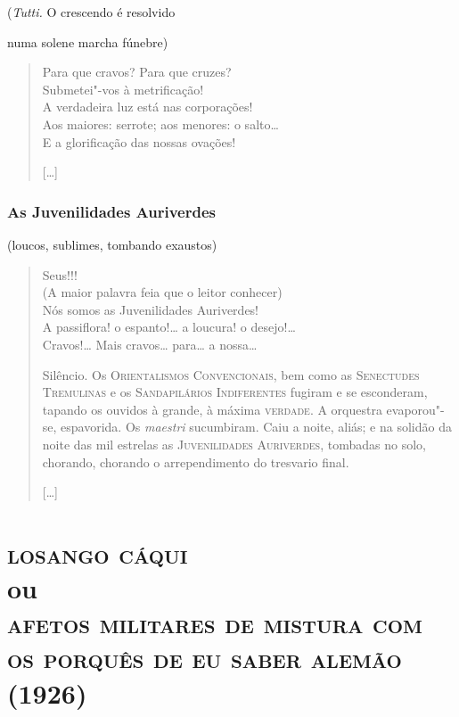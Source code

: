 \hfill{}(\emph{Tutti.} O crescendo é resolvido

\hfill{}numa solene marcha fúnebre)

\begin{verse}
Para que cravos? Para que cruzes?\\
Submetei"-vos à metrificação!\\
A verdadeira luz está nas corporações!\\
Aos maiores: serrote; aos menores: o salto\ldots{}\\
E a glorificação das nossas ovações!

{[}\ldots{}{]}
\end{verse}

\section*{As Juvenilidades Auriverdes}

\hfill{}(loucos, sublimes, tombando exaustos)

\begin{verse}
Seus\dotfill{}!!!\\
(A maior palavra feia que o leitor conhecer)\\
Nós somos as Juvenilidades Auriverdes!\\
A passiflora! o espanto!\ldots{} a loucura! o desejo!\ldots{}\\
Cravos!\ldots{} Mais cravos\ldots{} para\ldots{} a nossa\ldots{}

Silêncio. Os \textsc{Orientalismos Convencionais}, bem como as
\textsc{Senectudes Tremulinas} e os \textsc{Sandapilários Indiferentes}
fugiram e se esconderam, tapando os ouvidos à grande, à máxima \textsc{verdade}.
A orquestra evaporou"-se, espavorida. Os \emph{maestri} sucumbiram. Caiu
a noite, aliás; e na solidão da noite das mil estrelas as
\textsc{Juvenilidades Auriverdes}, tombadas no solo, chorando, chorando
o arrependimento do tresvario final.

{[}\ldots{}{]}
\end{verse}

\part[Losango cáqui]{\textsc{losango cáqui}\\ou\\\textsc{afetos militares de mistura com os porquês de eu saber alemão}\\(1926)}
\removeepigraph

